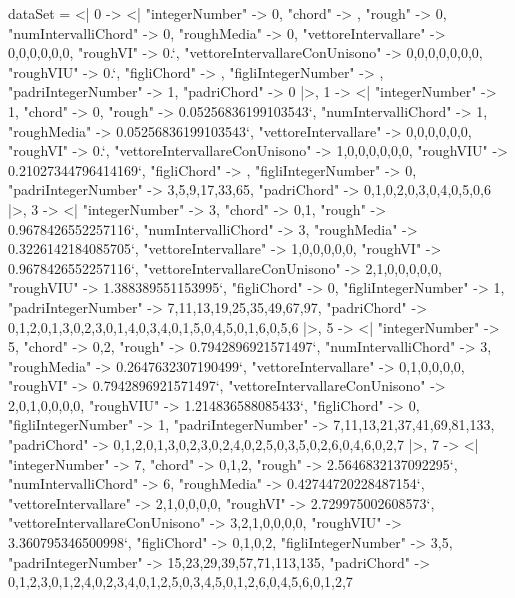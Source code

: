 \documentclass[
]{article}
\begin{document}
\begin{DatasetVerbatim}
dataSet = <|
  0 -> <|
    "integerNumber" -> 0,
    "chord" -> {},
    "rough" -> 0,
    "numIntervalliChord" -> 0,
    "roughMedia" -> 0,
    "vettoreIntervallare" -> {0,0,0,0,0,0},
    "roughVI" -> 0.`,
    "vettoreIntervallareConUnisono" -> {0,0,0,0,0,0,0},
    "roughVIU" -> 0.`,
    "figliChord" -> {},
    "figliIntegerNumber" -> {},
    "padriIntegerNumber" -> {1},
    "padriChord" -> {{0}}
  |>,
  1 -> <|
    "integerNumber" -> 1,
    "chord" -> {0},
    "rough" -> 0.05256836199103543`,
    "numIntervalliChord" -> 1,
    "roughMedia" -> 0.05256836199103543`,
    "vettoreIntervallare" -> {0,0,0,0,0,0},
    "roughVI" -> 0.`,
    "vettoreIntervallareConUnisono" -> {1,0,0,0,0,0,0},
    "roughVIU" -> 0.21027344796414169`,
    "figliChord" -> {{}},
    "figliIntegerNumber" -> {0},
    "padriIntegerNumber" -> {3,5,9,17,33,65},
    "padriChord" -> {{0,1},{0,2},{0,3},{0,4},{0,5},{0,6}}
  |>,
  3 -> <|
    "integerNumber" -> 3,
    "chord" -> {0,1},
    "rough" -> 0.9678426552257116`,
    "numIntervalliChord" -> 3,
    "roughMedia" -> 0.3226142184085705`,
    "vettoreIntervallare" -> {1,0,0,0,0,0},
    "roughVI" -> 0.9678426552257116`,
    "vettoreIntervallareConUnisono" -> {2,1,0,0,0,0,0},
    "roughVIU" -> 1.388389551153995`,
    "figliChord" -> {{0}},
    "figliIntegerNumber" -> {1},
    "padriIntegerNumber" -> {7,11,13,19,25,35,49,67,97},
    "padriChord" -> {{0,1,2},{0,1,3},{0,2,3},{0,1,4},{0,3,4},{0,1,5},{0,4,5},{0,1,6},{0,5,6}}
  |>,
  5 -> <|
    "integerNumber" -> 5,
    "chord" -> {0,2},
    "rough" -> 0.7942896921571497`,
    "numIntervalliChord" -> 3,
    "roughMedia" -> 0.2647632307190499`,
    "vettoreIntervallare" -> {0,1,0,0,0,0},
    "roughVI" -> 0.7942896921571497`,
    "vettoreIntervallareConUnisono" -> {2,0,1,0,0,0,0},
    "roughVIU" -> 1.214836588085433`,
    "figliChord" -> {{0}},
    "figliIntegerNumber" -> {1},
    "padriIntegerNumber" -> {7,11,13,21,37,41,69,81,133},
    "padriChord" -> {{0,1,2},{0,1,3},{0,2,3},{0,2,4},{0,2,5},{0,3,5},{0,2,6},{0,4,6},{0,2,7}}
  |>,
  7 -> <|
    "integerNumber" -> 7,
    "chord" -> {0,1,2},
    "rough" -> 2.5646832137092295`,
    "numIntervalliChord" -> 6,
    "roughMedia" -> 0.42744720228487154`,
    "vettoreIntervallare" -> {2,1,0,0,0,0},
    "roughVI" -> 2.729975002608573`,
    "vettoreIntervallareConUnisono" -> {3,2,1,0,0,0,0},
    "roughVIU" -> 3.360795346500998`,
    "figliChord" -> {{0,1},{0,2}},
    "figliIntegerNumber" -> {3,5},
    "padriIntegerNumber" -> {15,23,29,39,57,71,113,135},
    "padriChord" -> {{0,1,2,3},{0,1,2,4},{0,2,3,4},{0,1,2,5},{0,3,4,5},{0,1,2,6},{0,4,5,6},{0,1,2,7}}

\end{DatasetVerbatim}
\end{document}
